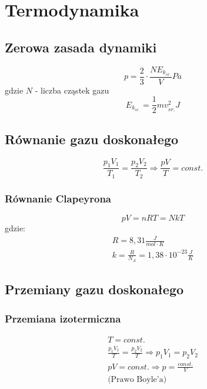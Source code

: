   \chapter{Termodynamika}
    \section{Zerowa zasada dynamiki}
      \begin{equation}
        p = \frac{2}{3}\cdot\frac{NE_{k_{\acute sr.}}}{V} \unit{Pa}
      \end{equation}
      gdzie $N$ - liczba cząstek gazu
      \begin{equation}
        E_{k_{\acute sr.}} = \frac{1}{2}mv_{\acute sr.}^2 \unit{J}
      \end{equation}
    \section{Równanie gazu doskonałego}
      \begin{equation}
        \frac{p_1V_1}{T_1} = \frac{p_2V_2}{T_2} \Rightarrow \frac{pV}{T} = const.
      \end{equation}
      \subsection{Równanie Clapeyrona}
        \begin{equation}
          pV = nRT = NkT
        \end{equation}
        gdzie:
        \begin{gather}
          R =  8,31 \unit{\frac{J}{mol\cdot K}}\\
          k = \frac{R}{N_A} = 1,38\cdot 10^{-23} \unit{\frac{J}{K}}
        \end{gather}
    \section{Przemiany gazu doskonałego}
      \subsection{Przemiana izotermiczna}
        \begin{gather}
          T = const.\\
          \frac{p_1V_1}{T} = \frac{p_2V_2}{T} \Rightarrow p_1V_1 = p_2V_2\\
          pV = const. \Rightarrow p = \frac{const.}{V}\\
          \text{(Prawo Boyle'a)}
        \end{gather}
